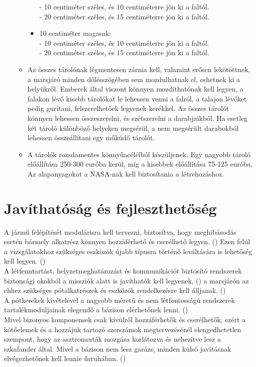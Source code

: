 \documentclass[12pt]{report}
\begin{document}
\begin{itemize}
\begin{itemize}
\begin{itemize}
           - 10 centiméter széles, és 10 centiméterre jön ki a faltól. \\
           - 20 centiméter széles, és 15 centiméterre jön ki a faltól. 
            \item 10 centiméter magasak: \\
           - 10 centiméter széles, és 10 centiméterre jön ki a faltól. \\
           - 20 centiméter széles, és 15 centiméterre jön ki a faltól. 
      \end{itemize}
      \item Az összes tárolónak légmentesen zárnia kell, valamint erősen lekötöttnek, a marsjáró minden dőlésszögében sem mozdulhatnak el, eshetnek ki a helyükről. Emberek által viszont könnyen mozdíthatónak kell legyen, a falakon lévő kisebb tárolókat le lehessen venni a falról, a talajon lévőket pedig gurítani, felszerelhetőek legyenek kerékkel. Az összes tárolót könnyen lehessen összeszerelni, és szétszerelni a darabjaikból. Ha esetleg két tároló különböző helyeken megsérül, a nem megsérült darabokból lehessen összeállítani egy műküdő tárolót. 
      \item A tárolók rozsdamentes könnyűacélélból készüljenek. Egy nagyobb tároló előállítása 250-300 euróba kerül, míg a kisebbek előállítása 75-125 euróba.
      Az alapanyagokat a NASA-nak kell biztosítania a létrehozáshoz. 
  \end{itemize}
\end{itemize}


\section{Javíthatóság és fejleszthetőség}

A jármű felépítését modulárisra kell tervezni, biztosítva, hogy meghibásodás esetén bármely alkatrész könnyen hozzáférhető és cserélhető legyen. () Ezen felül a vizsgálatokhoz szükséges eszközök újabb típusra történő leváltására is lehetőség kell legyen. () \\
A létfenntartást, helyzetmeghatározást és kommunikációt biztosító rendszerek biztonsági okokból a missziók alatt is javíthatók kell legyenek, () a marsjárón az ehhez szükséges pótalkatrészek és eszközök rendelkezésre kell álljanak. () \\
A pótkerekek kivételével a nagyobb méretű és nem létfontosságú rendszerek tartalékmoduljainak elegendő a bázison elérhetőnek lenni. () \\
Mivel bizonyos komponensek csak kívülről hozzáférhetők és cserélhetők, ezért a kötőelemek és a hozzájuk tartozó szerszámok megtervezésénél elengedhetetlen szempont, hogy az asztronauták mozgása korlátozva és nehezítve lesz a szkafander által. Mivel a bázison nem lesz garázs, minden külső javításnak elvégezhetőnek kell lennie űrruhában. ()
\end{document}
